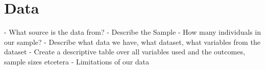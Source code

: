\section{Data}
- What source is the data from?
- Describe the Sample
- How many individuals in our sample?
- Describe what data we have, what dataset, what variables from the dataset
- Create a descriptive table over all variables used and the outcomes, sample sizes etcetera
- Limitations of our data
